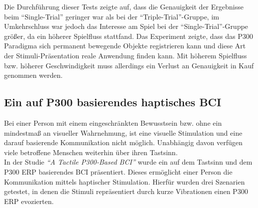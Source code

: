 Die Durchführung dieser Tests zeigte auf, dass die Genauigkeit der Ergebnisse beim "`Single-Trial"' geringer war als bei der "`Triple-Trial"'-Gruppe, 
im Umkehrschluss war jedoch das Interesse am Spiel bei der "`Single-Trial"'-Gruppe größer, da ein höherer Spielfluss stattfand.
Das Experiment zeigte, dass das P300 Paradigma sich permanent bewegende Objekte registrieren kann \cite[S12]{P300Moving} und diese Art der Stimuli-Präsentation reale Anwendung finden kann. 
Mit höherem Spielfluss bzw. höherer Geschwindigkeit muss allerdings ein Verlust an Genauigkeit in Kauf genommen werden.\\











\pagebreak
\subsection{Ein auf P300 basierendes haptisches \acs{BCI}}
\vspace{0.3cm}

Bei einer Person mit einem eingeschränkten Bewusstsein bzw. ohne ein mindestmaß an visueller Wahrnehmung, ist eine visuelle Stimulation und eine darauf basierende Kommunikation nicht möglich.
Unabhängig davon verfügen viele betroffene Menschen weiterhin über ihren Tastsinn.\\
In der Studie \textit{"`A Tactile P300-Based BCI"'} \cite[Art. 98]{P300Tactile} wurde ein auf dem Tastsinn und dem \acs{P300 ERP} basierendes \acs{BCI} präsentiert.
Dieses ermöglicht einer Person die Kommunikation mittels haptischer Stimulation.
Hierfür wurden drei Szenarien getestet, in denen die Stimuli repräsentiert durch kurze Vibrationen einen \acs{P300 ERP} evozierten.\\

